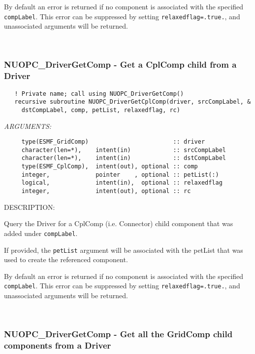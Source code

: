    By default an error is returned if no component is associated with the 
   specified {\tt compLabel}. This error can be suppressed by setting
   {\tt relaxedflag=.true.}, and unassociated arguments will be returned. 
 
\mbox{}\hrulefill\ 
 
\subsubsection [NUOPC\_DriverGetComp] {NUOPC\_DriverGetComp - Get a CplComp child from a Driver}


  
\begin{verbatim}   ! Private name; call using NUOPC_DriverGetComp()
   recursive subroutine NUOPC_DriverGetCplComp(driver, srcCompLabel, &
     dstCompLabel, comp, petList, relaxedflag, rc)\end{verbatim}{\em ARGUMENTS:}
\begin{verbatim}     type(ESMF_GridComp)                        :: driver
     character(len=*),    intent(in)            :: srcCompLabel
     character(len=*),    intent(in)            :: dstCompLabel
     type(ESMF_CplComp),  intent(out), optional :: comp
     integer,             pointer    , optional :: petList(:)
     logical,             intent(in),  optional :: relaxedflag
     integer,             intent(out), optional :: rc \end{verbatim}
{\sf DESCRIPTION:\\ }


   Query the Driver for a CplComp (i.e. Connector) child 
   component that was added under {\tt compLabel}.
  
   If provided, the {\tt petList} argument will be associated with the petList
   that was used to create the referenced component.
  
   By default an error is returned if no component is associated with the 
   specified {\tt compLabel}. This error can be suppressed by setting
   {\tt relaxedflag=.true.}, and unassociated arguments will be returned. 
 
\mbox{}\hrulefill\ 
 
\subsubsection [NUOPC\_DriverGetComp] {NUOPC\_DriverGetComp - Get all the GridComp child components from a Driver}


